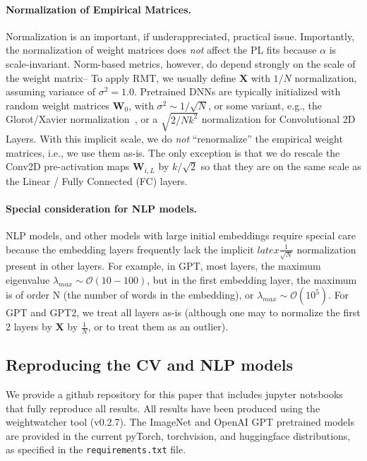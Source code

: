 \paragraph{Normalization of Empirical Matrices.}  
Normalization is an important, if underappreciated, practical issue.
Importantly, the normalization of weight matrices does \emph{not} affect the PL fits because $\alpha$ is scale-invariant.
Norm-based metrics, however, do depend strongly on the scale of the weight matrix--
To apply RMT, we usually define $\mathbf{X}$ with $1/N$ normalization, assuming variance of $\sigma^{2}=1.0$.
Pretrained DNNs are typically initialized with random weight matrices $\mathbf{W}_{0}$, with
 $\sigma^{2}\sim 1/\sqrt{N}$, or some variant, e.g., the Glorot/Xavier normalization~\cite{GloRot}, or a $\sqrt{2/Nk^2}$ normalization for Convolutional 2D Layers. With this implicit scale, 
we do \emph{not} ``renormalize'' the empirical weight matrices, i.e., we use them as-is.
The only exception is that we do rescale the Conv2D pre-activation maps $\mathbf{W}_{i,L}$ 
by $k/\sqrt{2}$ so that they are on the same scale as the Linear / Fully Connected (FC) layers.

\paragraph{Special consideration for NLP models.}
NLP models, and other models with large initial embeddings require special care because the
embedding layers frequently lack the implicit $latex\frac{1}{\sqrt{N}}$ normalization present in other layers.
For example, in GPT, most layers, the maximum eigenvalue $\lambda_{max}\sim\mathcal{O}(10-100)$,
but in the first embedding layer, the maximum is of order N (the number of words in the embedding), or
 $\lambda_{max}\sim\mathcal{O}(10^{5})$.  For GPT and GPT2, we treat all layers as-is (although one may to normalize
the first 2 layers by  $\mathbf{X}$ by $\frac{1}{N}$, or to treat them as an outlier).

\subsection{Reproducing the CV and NLP models }

We provide a github repository for this paper that includes jupyter notsbooks that fully reproduce all results.
All results have been produced using the weightwatcher tool (v0.2.7).
The ImageNet and OpenAI GPT pretrained models are provided in the current pyTorch, torchvision, and huggingface distributions,
as specified in the \texttt{requirements.txt} file.

